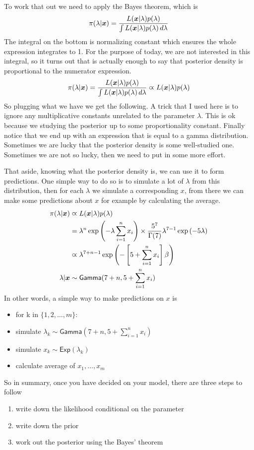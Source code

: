 \documentclass{article}
\begin{document}
To work that out we need to apply the Bayes theorem, which is
\[
\pi(\lambda|\boldsymbol{x})=\frac{L(\boldsymbol{x}|\lambda)p(\lambda)}{\int L(\boldsymbol{x}|\lambda)p(\lambda)\,d\lambda}
\]
The integral on the bottom is normalizing constant which ensures the whole expression integrates to 1. For the purpose of today, we are not interested in this integral, so it turns out that is actually enough to say that posterior density is proportional to the numerator expression.
\[
\pi(\lambda|\boldsymbol{x})=\frac{L(\boldsymbol{x}|\lambda)p(\lambda)}{\int L(\boldsymbol{x}|\lambda)p(\lambda)\,d\lambda}\varpropto L(\boldsymbol{x}|\lambda)p(\lambda)
\]
So plugging what we have we get the following. A trick that I used here is to ignore any multiplicative constants unrelated to the parameter $\lambda$. This is ok because we studying the posterior up to some proportionality constant. Finally notice that we end up with an expression that is equal to a gamma distribution. Sometimes we are lucky that the posterior density is some well-studied one. Sometimes we are not so lucky, then we need to put in some more effort. 

That aside, knowing what the posterior density is, we can use it to form predictions. One simple way to do so is to simulate a lot of $\lambda$ from this distribution, then for each $\lambda$ we simulate a corresponding $x$, from there we can make some predictions about $x$ for example by calculating the average.
\[
\begin{split}
\pi(\lambda|\boldsymbol{x})&\varpropto L(\boldsymbol{x}|\lambda)p(\lambda)\\
&=\lambda^n\exp\left(-\lambda\sum_{i=1}^nx_i\right)\times\frac{5^7}{\Gamma(7)}\lambda^{7-1}\exp\left(-5\lambda\right)\\
&\varpropto\lambda^{7+n-1}\exp\left(-\left[5+\sum_{i=1}^nx_i\right]\beta\right)\\
\lambda|\boldsymbol{x}&\sim\mathsf{Gamma}(7+n,5+\sum_{i=1}^nx_i)
\end{split}
\]
In other words, a simple way to make predictions on $x$ is
\begin{itemize}
	\item for k in $\{1,2,\ldots,m\}$:
	\item simulate $\lambda_k\sim\mathsf{Gamma}(7+n,5+\sum_{i=1}^nx_i)$
	\item simulate $x_k\sim\mathsf{Exp}(\lambda_k)$
	\item calculate average of $x_1,\ldots,x_m$
\end{itemize}




So in summary, once you have decided on your model, there are three steps to follow
\begin{enumerate}
	\item write down the likelihood conditional on the parameter
	\item write down the prior
	\item work out the posterior using the Bayes' theorem
\end{enumerate}
\end{document}
